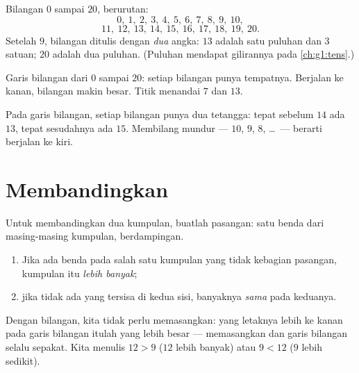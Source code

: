 \begin{example}\label{ex:g1:counting:writing}
Bilangan $0$ sampai $20$, berurutan:
\[
0,\ 1,\ 2,\ 3,\ 4,\ 5,\ 6,\ 7,\ 8,\ 9,\ 10,
\]
\[
11,\ 12,\ 13,\ 14,\ 15,\ 16,\ 17,\ 18,\ 19,\ 20 .
\]
Setelah $9$, bilangan ditulis dengan \emph{dua} angka: $13$ adalah satu
puluhan dan $3$ satuan; $20$ adalah dua puluhan. (Puluhan mendapat
gilirannya pada \cref{ch:g1:tens}.)
\end{example}

\begin{omfigure}

{\small Garis bilangan dari $0$ sampai $20$: setiap bilangan punya
tempatnya. Berjalan ke kanan, bilangan makin besar. Titik menandai $7$
dan $13$.}
\end{omfigure}

\begin{example}\label{ex:g1:counting:neighbors}
Pada garis bilangan, setiap bilangan punya dua tetangga: tepat sebelum
$14$ ada $13$, tepat sesudahnya ada $15$. Membilang mundur --- $10$,
$9$, $8$, \dots\ --- berarti berjalan ke kiri.
\end{example}

\section{Membandingkan}

\begin{method}\label{met:g1:counting:compare}
Untuk membandingkan dua kumpulan, buatlah pasangan: satu benda dari
masing-masing kumpulan, berdampingan.
\begin{enumerate}
  \item Jika ada benda pada salah satu kumpulan yang tidak kebagian
        pasangan, kumpulan itu \emph{lebih banyak};
  \item jika tidak ada yang tersisa di kedua sisi, banyaknya
        \emph{sama} pada keduanya.
\end{enumerate}
Dengan bilangan, kita tidak perlu memasangkan: yang letaknya lebih ke
kanan pada garis bilangan itulah yang lebih besar --- memasangkan dan
garis bilangan selalu sepakat. Kita menulis $12 > 9$ ($12$ lebih
banyak) atau $9 < 12$ ($9$ lebih sedikit).
\end{method}

